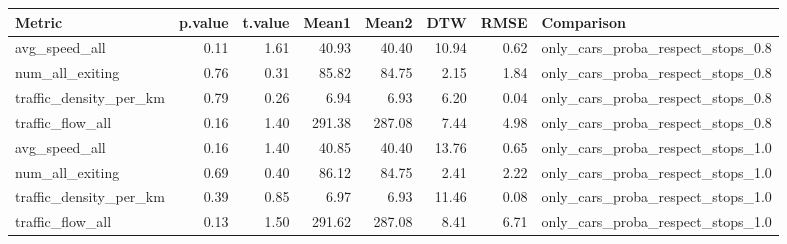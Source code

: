 \begin{table}[ht]
\centering
\begin{tabular}{lrrrrrrl}
  \hline
Metric & p.value & t.value & Mean1 & Mean2 & DTW & RMSE & Comparison \\ 
  \hline
avg\_speed\_all & 0.11 & 1.61 & 40.93 & 40.40 & 10.94 & 0.62 & only\_cars\_proba\_respect\_stops\_0.8 \\ 
  num\_all\_exiting & 0.76 & 0.31 & 85.82 & 84.75 & 2.15 & 1.84 & only\_cars\_proba\_respect\_stops\_0.8 \\ 
  traffic\_density\_per\_km & 0.79 & 0.26 & 6.94 & 6.93 & 6.20 & 0.04 & only\_cars\_proba\_respect\_stops\_0.8 \\ 
  traffic\_flow\_all & 0.16 & 1.40 & 291.38 & 287.08 & 7.44 & 4.98 & only\_cars\_proba\_respect\_stops\_0.8 \\ 
  avg\_speed\_all & 0.16 & 1.40 & 40.85 & 40.40 & 13.76 & 0.65 & only\_cars\_proba\_respect\_stops\_1.0 \\ 
  num\_all\_exiting & 0.69 & 0.40 & 86.12 & 84.75 & 2.41 & 2.22 & only\_cars\_proba\_respect\_stops\_1.0 \\ 
  traffic\_density\_per\_km & 0.39 & 0.85 & 6.97 & 6.93 & 11.46 & 0.08 & only\_cars\_proba\_respect\_stops\_1.0 \\ 
  traffic\_flow\_all & 0.13 & 1.50 & 291.62 & 287.08 & 8.41 & 6.71 & only\_cars\_proba\_respect\_stops\_1.0 \\ 
   \hline
\end{tabular}
\end{table}
